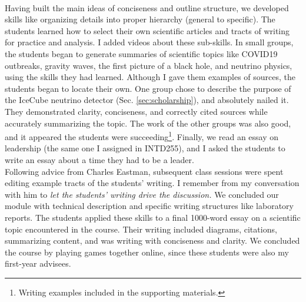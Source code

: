 \documentclass[../../../main.tex]{subfiles}
\begin{document}
\\
\vspace{0.15cm}
Having built the main ideas of conciseness and outline structure, we developed skills like organizing details into proper hierarchy (general to specific).  The students learned how to select their own scientific articles and tracts of writing for practice and analysis.  I added videos about these sub-skills.  In small groups, the students began to generate summaries of scientific topics like COVID19 outbreaks, gravity waves, the first picture of a black hole, and neutrino physics, using the skills they had learned.  Although I gave them examples of sources, the students began to locate their own.  One group chose to describe the purpose of the IceCube neutrino detector (Sec. \ref{sec:scholarship}), and absolutely nailed it.  They demonstrated clarity, conciseness, and correctly cited sources while accurately summarizing the topic.  The work of the other groups was also good, and it appeared the students were succeeding\footnote{Writing examples included in the supporting materials.}.  Finally, we read an essay on leadership (the same one I assigned in INTD255), and I asked the students to write an essay about a time they had to be a leader.
\\
\vspace{0.15cm}
Following advice from Charles Eastman, subsequent class sessions were spent editing example tracts of the students' writing.  I remember from my conversation with him to \textit{let the students' writing drive the discussion.}  We concluded our module with technical description and specific writing structures like laboratory reports.  The students applied these skills to a final 1000-word essay on a scientific topic encountered in the course.  Their writing included diagrams, citations, summarizing content, and was writing with conciseness and clarity.  We concluded the course by playing games together online, since these students were also my first-year advisees.
\end{document}
